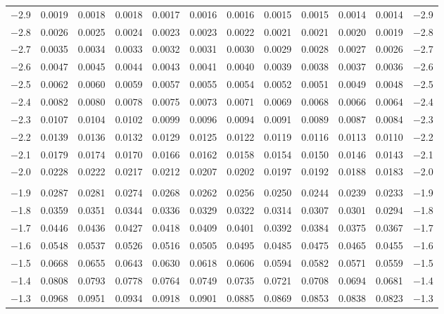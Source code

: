 \documentclass[12pt]{article}
\begin{document}
\begin{landscape}
\begin{adjustbox}{angle=270}
\begin{tabular}{
  r 
  @{\hspace{4.5mm}}
  *{5}{c @{\hspace{2.5mm}}} 
  @{\hspace{-0.5mm}}
  *{5}{@{\hspace{2.5mm}} c} 
  @{\hspace{2mm}}
  r
  }
$-$2.9	&	0.0019	&	0.0018	&	0.0018	&	0.0017	&	0.0016	&	0.0016	&	0.0015	&	0.0015	&	0.0014	&	0.0014	&	$-$2.9	\\
$-$2.8	&	0.0026	&	0.0025	&	0.0024	&	0.0023	&	0.0023	&	0.0022	&	0.0021	&	0.0021	&	0.0020	&	0.0019	&	$-$2.8	\\
$-$2.7	&	0.0035	&	0.0034	&	0.0033	&	0.0032	&	0.0031	&	0.0030	&	0.0029	&	0.0028	&	0.0027	&	0.0026	&	$-$2.7	\\
$-$2.6	&	0.0047	&	0.0045	&	0.0044	&	0.0043	&	0.0041	&	0.0040	&	0.0039	&	0.0038	&	0.0037	&	0.0036	&	$-$2.6	\\
$-$2.5	&	0.0062	&	0.0060	&	0.0059	&	0.0057	&	0.0055	&	0.0054	&	0.0052	&	0.0051	&	0.0049	&	0.0048	&	$-$2.5	\\
$-$2.4	&	0.0082	&	0.0080	&	0.0078	&	0.0075	&	0.0073	&	0.0071	&	0.0069	&	0.0068	&	0.0066	&	0.0064	&	$-$2.4	\\
$-$2.3	&	0.0107	&	0.0104	&	0.0102	&	0.0099	&	0.0096	&	0.0094	&	0.0091	&	0.0089	&	0.0087	&	0.0084	&	$-$2.3	\\
$-$2.2	&	0.0139	&	0.0136	&	0.0132	&	0.0129	&	0.0125	&	0.0122	&	0.0119	&	0.0116	&	0.0113	&	0.0110	&	$-$2.2	\\
$-$2.1	&	0.0179	&	0.0174	&	0.0170	&	0.0166	&	0.0162	&	0.0158	&	0.0154	&	0.0150	&	0.0146	&	0.0143	&	$-$2.1	\\
$-$2.0	&	0.0228	&	0.0222	&	0.0217	&	0.0212	&	0.0207	&	0.0202	&	0.0197	&	0.0192	&	0.0188	&	0.0183	&	$-$2.0	\\
&&&&&&&&&&{} \\																							
$-$1.9	&	0.0287	&	0.0281	&	0.0274	&	0.0268	&	0.0262	&	0.0256	&	0.0250	&	0.0244	&	0.0239	&	0.0233	&	$-$1.9	\\
$-$1.8	&	0.0359	&	0.0351	&	0.0344	&	0.0336	&	0.0329	&	0.0322	&	0.0314	&	0.0307	&	0.0301	&	0.0294	&	$-$1.8	\\
$-$1.7	&	0.0446	&	0.0436	&	0.0427	&	0.0418	&	0.0409	&	0.0401	&	0.0392	&	0.0384	&	0.0375	&	0.0367	&	$-$1.7	\\
$-$1.6	&	0.0548	&	0.0537	&	0.0526	&	0.0516	&	0.0505	&	0.0495	&	0.0485	&	0.0475	&	0.0465	&	0.0455	&	$-$1.6	\\
$-$1.5	&	0.0668	&	0.0655	&	0.0643	&	0.0630	&	0.0618	&	0.0606	&	0.0594	&	0.0582	&	0.0571	&	0.0559	&	$-$1.5	\\
$-$1.4	&	0.0808	&	0.0793	&	0.0778	&	0.0764	&	0.0749	&	0.0735	&	0.0721	&	0.0708	&	0.0694	&	0.0681	&	$-$1.4	\\
$-$1.3	&	0.0968	&	0.0951	&	0.0934	&	0.0918	&	0.0901	&	0.0885	&	0.0869	&	0.0853	&	0.0838	&	0.0823	&	$-$1.3	\\

\end{tabular}
\end{adjustbox}
\end{landscape}
\end{document}
